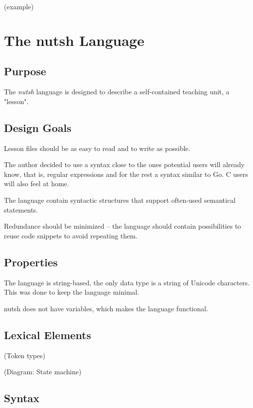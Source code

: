\documentclass[twoside,blue]{tubsreprt}
\begin{document}

(example)

\chapter{The nutsh Language}

\section{Purpose}

The \emph{nutsh} language is designed to describe a self-contained teaching unit, a "lesson".

\section{Design Goals}

Lesson files should be as easy to read and to write as possible.

The author decided to use a syntax close to the ones potential users will already know, that is, regular expressions and for the rest a syntax similar to Go. C users will also feel at home.

The language contain syntactic structures that support often-used semantical statements.

Redundance should be minimized -- the language should contain possibilities to reuse code snippets to avoid repeating them.

\section{Properties}

The language is string-based, the only data type is a string of Unicode characters. This was done to keep the language minimal.

nutsh does not have variables, which makes the language functional.

\section{Lexical Elements}

(Token types)

(Diagram: State machine)

\section{Syntax}
\end{document}
